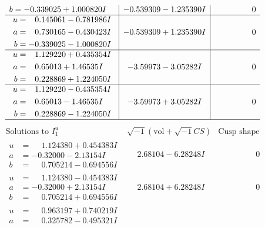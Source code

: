 \documentclass[1p]{elsarticle_modified}
\theoremstyle{definition}
\newcommand{\I}{\sqrt{-1}}
\begin{document}
$$\begin{array}{c|c|c}
\begin{aligned}
b &= -0.339025 + 1.000820 I\end{aligned}
 & -0.539309 - 1.235390 I & \phantom{-0.000000 } 0 \\ \hline\begin{aligned}
u &= \phantom{-}0.145061 - 0.781986 I \\
a &= \phantom{-}0.730165 - 0.430423 I \\
b &= -0.339025 - 1.000820 I\end{aligned}
 & -0.539309 + 1.235390 I & \phantom{-0.000000 } 0 \\ \hline\begin{aligned}
u &= \phantom{-}1.129220 + 0.435354 I \\
a &= \phantom{-}0.65013 + 1.46535 I \\
b &= \phantom{-}0.228869 + 1.224050 I\end{aligned}
 & -3.59973 - 3.05282 I & \phantom{-0.000000 } 0 \\ \hline\begin{aligned}
u &= \phantom{-}1.129220 - 0.435354 I \\
a &= \phantom{-}0.65013 - 1.46535 I \\
b &= \phantom{-}0.228869 - 1.224050 I\end{aligned}
 & -3.59973 + 3.05282 I & \phantom{-0.000000 } 0\\
 \hline 
 \end{array}$$\newpage$$\begin{array}{c|c|c}  
\text{Solutions to }I^u_{1}& \I (\text{vol} + \sqrt{-1}CS) & \text{Cusp shape}\\
 \hline 
\begin{aligned}
u &= \phantom{-}1.124380 + 0.454383 I \\
a &= -0.32000 - 2.13154 I \\
b &= \phantom{-}0.705214 - 0.694556 I\end{aligned}
 & \phantom{-}2.68104 - 6.28248 I & \phantom{-0.000000 } 0 \\ \hline\begin{aligned}
u &= \phantom{-}1.124380 - 0.454383 I \\
a &= -0.32000 + 2.13154 I \\
b &= \phantom{-}0.705214 + 0.694556 I\end{aligned}
 & \phantom{-}2.68104 + 6.28248 I & \phantom{-0.000000 } 0 \\ \hline\begin{aligned}
u &= \phantom{-}0.963197 + 0.740219 I \\
a &= \phantom{-}0.325782 - 0.495321 I \\

\end{aligned}
\end{array}$$
\end{document}
